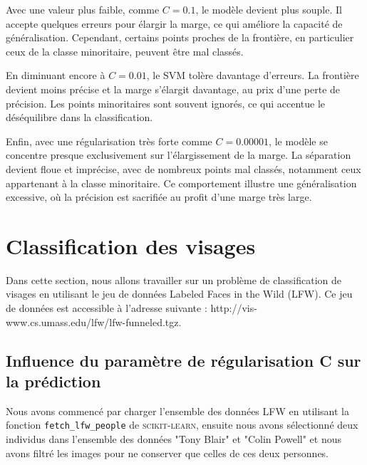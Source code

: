 \documentclass[12pt,a4paper]{report}
\begin{document}
Avec une valeur plus faible, comme $C = 0.1$, le modèle devient plus souple. Il accepte quelques erreurs pour élargir la marge, ce qui améliore la capacité de généralisation. Cependant, certains points proches de la frontière, en particulier ceux de la classe minoritaire, peuvent être mal classés.

En diminuant encore à $C = 0.01$, le SVM tolère davantage d’erreurs. La frontière devient moins précise et la marge s’élargit davantage, au prix d’une perte de précision. Les points minoritaires sont souvent ignorés, ce qui accentue le déséquilibre dans la classification.

Enfin, avec une régularisation très forte comme $C = 0.00001$, le modèle se concentre presque exclusivement sur l’élargissement de la marge. La séparation devient floue et imprécise, avec de nombreux points mal classés, notamment ceux appartenant à la classe minoritaire. Ce comportement illustre une généralisation excessive, où la précision est sacrifiée au profit d’une marge très large.





\section{Classification des visages}
Dans cette section, nous allons travailler sur un problème de classification de visages en
 utilisant le jeu de données Labeled Faces in the Wild (LFW). Ce jeu de données est accessible
 à l’adresse suivante : http://vis-www.cs.umass.edu/lfw/lfw-funneled.tgz.
 
\subsection{Influence du paramètre de régularisation C sur la prédiction}

Nous avons commencé par charger l'ensemble des données LFW en utilisant la fonction \texttt{fetch\_lfw\_people} de \textsc{scikit-learn}, ensuite nous avons sélectionné deux individus dans l'ensemble des données  "Tony Blair" et "Colin Powell" et  nous avons filtré les images pour ne conserver que celles de ces deux personnes.\\
\end{document}

